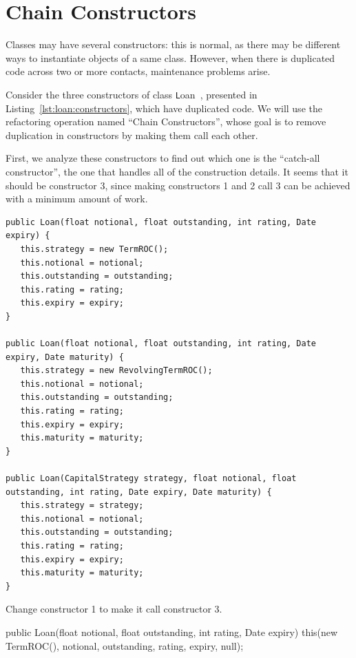 \documentclass[a4paper,11pt]{memoir}
\newcommand{\code}[1]{{\texttt #1}}
\begin{document}
\newpage

\section{Chain Constructors}

Classes may have several constructors: this is normal, as there may be different ways to instantiate objects of a same class.
However, when there is duplicated code across two or more contacts, maintenance problems arise. 

Consider the three constructors of class \code{Loan}~\cite{Kerievsky:2004}, presented in Listing~\ref{lst:loan:constructors}, which have duplicated code.
We will use the refactoring operation named ``Chain Constructors'', whose goal is to remove duplication in constructors by making them call each other.

First, we analyze these constructors to find out which one is the ``catch-all constructor'', the one that handles all of the construction details.
It seems that it should be constructor 3, since making constructors 1 and 2 call 3 can be achieved with a minimum amount of work.

\begin{lstlisting}[caption={Constructors for class \code{Loan}},label=lst:loan:constructors,float=htbp,frame=tb]
public Loan(float notional, float outstanding, int rating, Date expiry) {
   this.strategy = new TermROC();
   this.notional = notional;
   this.outstanding = outstanding;
   this.rating = rating;
   this.expiry = expiry;
}

public Loan(float notional, float outstanding, int rating, Date expiry, Date maturity) {
   this.strategy = new RevolvingTermROC();
   this.notional = notional;
   this.outstanding = outstanding;
   this.rating = rating;
   this.expiry = expiry;
   this.maturity = maturity;
}

public Loan(CapitalStrategy strategy, float notional, float outstanding, int rating, Date expiry, Date maturity) {
   this.strategy = strategy;
   this.notional = notional;
   this.outstanding = outstanding;
   this.rating = rating;
   this.expiry = expiry;
   this.maturity = maturity;
}
\end{lstlisting}



\begin{exercise}
Change constructor 1 to make it call constructor 3.
\end{exercise}

\begin{solution}
\begin{java}
public Loan(float notional, float outstanding, int rating, Date expiry) {
    this(new TermROC(), notional, outstanding, rating, expiry, null);
}	
\end{java}
\end{solution}
\end{document}

